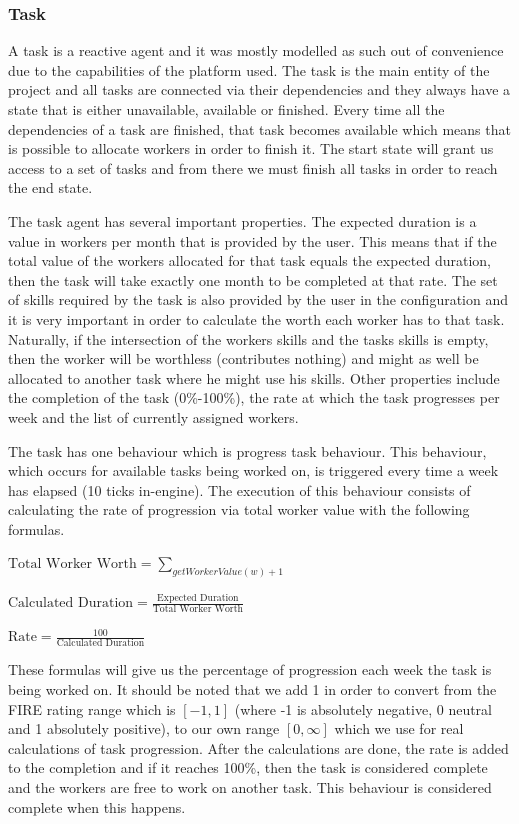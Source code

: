 \documentclass[paper=a4, fontsize=11pt]{scrartcl} %
\numberwithin{equation}{section} %
\numberwithin{figure}{section} %
\numberwithin{table}{section} %
\begin{document}
\subsubsection{Task}
A task is a reactive agent and it was mostly modelled as such out of convenience due to the capabilities of the platform used. The task is the main entity of the project and all tasks are connected via their dependencies and they always have a state that is either unavailable, available or finished. Every time all the dependencies of a task are finished, that task becomes available which means that is possible to allocate workers in order to finish it. The start state will grant us access to a set of tasks and from there we must finish all tasks in order to reach the end state.

The task agent has several important properties. The expected duration is a value in workers per month that is provided by the user. This means that if the total value of the workers allocated for that task equals the expected duration, then the task will take exactly one month to be completed at that rate.
The set of skills required by the task is also provided by the user in the configuration and it is very important in order to calculate the worth each worker has to that task. Naturally, if the intersection of the workers skills and the tasks skills is empty, then the worker will be worthless (contributes nothing) and might as well be allocated to another task where he might use his skills. Other properties include the completion of the task (0\%-100\%), the rate at which the task progresses per week and the list of currently assigned workers.

The task has one behaviour which is progress task behaviour. This behaviour, which occurs for available tasks being worked on, is triggered every time a week has elapsed (10 ticks in-engine). The execution of this behaviour consists of calculating the rate of progression via total worker value with the following formulas.
\begin{center}
	$\text{Total Worker Worth} = \sum\nolimits_{getWorkerValue(w) + 1}$
\end{center}
\begin{center}
	$\text{Calculated Duration} = \frac{\text{Expected Duration}}{\text{Total Worker Worth}}$
\end{center}
\begin{center}
		$\text{Rate} = \frac
		{100}
		{\text{Calculated Duration}}$
\end{center}
These formulas will give us the percentage of progression each week the task is being worked on. It should be noted that we add 1 in order to convert from the FIRE rating range which is $[-1,1]$ (where -1 is absolutely negative, 0 neutral and 1 absolutely positive), to our own range $[0,\infty]$ which we use for real calculations of task progression.
After the calculations are done, the rate is added to the completion and if it reaches 100\%, then the task is considered complete and the workers are free to work on another task. This behaviour is considered complete when this happens.
\end{document}
